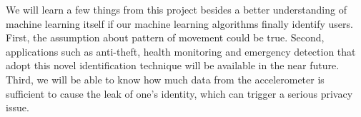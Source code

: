 \documentclass{article} %
\begin{document}
We will learn a few things from this project besides a better understanding of machine learning itself if our machine learning algorithms finally identify users. First, the assumption about pattern of movement could be true. Second, applications such as anti-theft, health monitoring and emergency detection that adopt this novel identification technique will be available in the near future. Third, we will be able to know how much data from the accelerometer is sufficient to cause the leak of one's identity, which can trigger a serious privacy issue.






\end{document}
